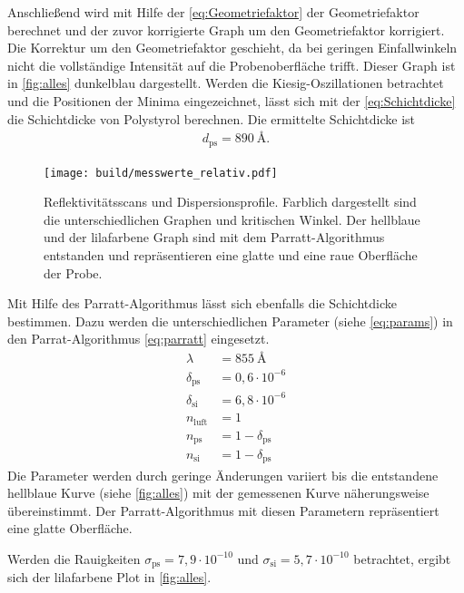 Anschließend wird mit Hilfe der \autoref{eq:Geometriefaktor} der Geometriefaktor berechnet und der zuvor korrigierte Graph um den Geometriefaktor korrigiert. 
Die Korrektur um den Geometriefaktor geschieht, da bei geringen Einfallwinkeln nicht die vollständige Intensität auf die Probenoberfläche trifft. 
Dieser Graph ist in \autoref{fig:alles} dunkelblau dargestellt. 
Werden die Kiesig-Oszillationen betrachtet und die Positionen der Minima eingezeichnet, lässt sich mit der \autoref{eq:Schichtdicke} die 
Schichtdicke von Polystyrol berechnen.
Die ermittelte Schichtdicke ist
\begin{align*}
    d_\text{ps} = \SI{890}{\angstrom}.
\end{align*}
\begin{figure}
    \centering
    \texttt{[image: build/messwerte\_relativ.pdf]}
    \caption{Reflektivitätsscans und Dispersionsprofile. Farblich dargestellt sind die unterschiedlichen Graphen und kritischen Winkel.
            Der hellblaue und der lilafarbene Graph sind mit dem Parratt-Algorithmus entstanden und repräsentieren eine glatte und eine raue Oberfläche der Probe. }
    \label{fig:alles}
\end{figure}
\FloatBarrier
Mit Hilfe des Parratt-Algorithmus lässt sich ebenfalls die Schichtdicke bestimmen. 
Dazu werden die unterschiedlichen Parameter (siehe \autoref{eq:params}) in den Parrat-Algorithmus \autoref{eq:parratt} eingesetzt.
\begin{equation}\label{eq:params}    
    \begin{split}
        \lambda &= \SI{855}{\angstrom}\\
        \delta_\text{ps} &= 0,6\cdot 10^{-6}\\
        \delta_\text{si}&= 6,8\cdot 10^{-6} \\
        n_\text{luft} &= 1 \\
        n_\text{ps} &= 1 - \delta_\text{ps} \\
        n_\text{si} &= 1 - \delta_\text{ps} 
    \end{split}
\end{equation}
Die Parameter werden durch geringe Änderungen variiert bis die entstandene hellblaue Kurve (siehe \autoref{fig:alles}) mit der gemessenen
Kurve näherungsweise übereinstimmt. 
Der Parratt-Algorithmus mit diesen Parametern repräsentiert eine glatte Oberfläche.

Werden die Rauigkeiten $\sigma_\text{ps} = 7,9\cdot 10^{-10}$ und $\sigma_\text{si} = 5,7\cdot 10^{-10}$
betrachtet, ergibt sich der lilafarbene Plot in \autoref{fig:alles}.

